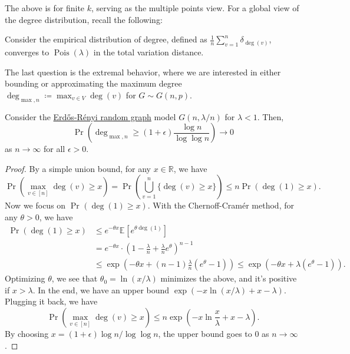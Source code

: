 The above is for finite \(k\), serving as the multiple points view. For a global view of the degree distribution, recall the following:

\begin{prev}
	Consider the empirical distribution of degree, defined as \(\frac{1}{n} \sum_{v=1}^{n} \delta _{\deg(v)}\), converges to \(\operatorname{Pois}(\lambda ) \) in the total variation distance.
\end{prev}

The last question is the extremal behavior, where we are interested in either bounding or approximating the maximum degree \(\deg _{\max , n} \coloneqq \max _{v \in V} \deg (v)\) for \(G \sim G(n, p)\).

\begin{proposition}\label{prop:Erdős-Rényi-max-degree}
	Consider the \hyperref[def:Erdős-Rényi-random-graph]{Erdős-Rényi random graph} model \(G(n, \lambda / n)\) for \(\lambda < 1\). Then,
	\[
		\Pr_{}\left( \deg _{\max , n} \geq (1 + \epsilon ) \frac{\log n}{\log \log n} \right)  \to 0
	\]
	as \(n \to \infty \) for all \(\epsilon > 0\).
\end{proposition}
\begin{proof}
	By a simple union bound, for any \(x \in \mathbb{R} \), we have
	\[
		\Pr_{}\left( \max _{v \in [n]} \deg (v) \geq x\right)
		= \Pr_{}\left( \bigcup_{v=1}^{n} \{ \deg (v) \geq x \} \right)
		\leq n \Pr_{}(\deg (1) \geq x) .
	\]
	Now we focus on \(\Pr_{}(\deg (1) \geq x) \). With the Chernoff-Cramér method, for any \(\theta > 0\), we have
	\begin{align*}
		\Pr_{}(\deg (1) \geq x)
		 & \leq e^{-\theta x} \mathbb{E}_{}[e^{\theta \deg (1)}]                                             \\
		 & = e^{-\theta x} \cdot \left( 1 - \frac{\lambda}{n} + \frac{\lambda}{n} e^{\theta } \right) ^{n-1} \\
		 & \leq \exp (-\theta x + (n-1) \frac{\lambda}{n} (e^\theta - 1))
		\leq \exp (-\theta x + \lambda (e^\theta - 1)). \tag*{(\(1 + t \leq e^t\))}
	\end{align*}
	Optimizing \(\theta \), we see that \(\theta _0 = \ln (x / \lambda )\) minimizes the above, and it's positive if \(x > \lambda \). In the end, we have an upper bound \(\exp (-x \ln (x / \lambda ) + x - \lambda )\). Plugging it back, we have
	\[
		\Pr_{}\left( \max _{v \in [n]} \deg (v) \geq x\right)
		\leq n \exp (- x \ln \frac{x}{\lambda } + x - \lambda ).
	\]
	By choosing \(x = (1 + \epsilon ) \log n / \log \log n\), the upper bound goes to \(0\) as \(n \to \infty \).
\end{proof}

